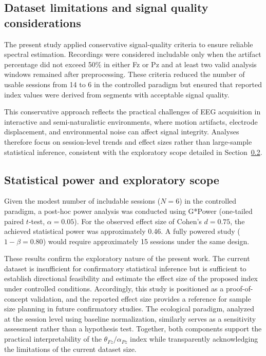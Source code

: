 \documentclass[10pt]{iopart}
\begin{document}
\subsection{Dataset limitations and signal quality considerations}

The present study applied conservative signal-quality criteria
to ensure reliable spectral estimation. Recordings were considered
includable only when the artifact percentage did not exceed 50\%
in either Fz or Pz and at least two valid analysis windows
remained after preprocessing. These criteria reduced the number
of usable sessions from 14 to 6 in the controlled paradigm but
ensured that reported index values were derived from segments
with acceptable signal quality.

This conservative approach reflects the practical challenges of
EEG acquisition in interactive and semi-naturalistic environments,
where motion artifacts, electrode displacement, and environmental
noise can affect signal integrity. Analyses therefore focus on
session-level trends and effect sizes rather than large-sample
statistical inference, consistent with the exploratory scope
detailed in Section~\ref{sec:power}.

\subsection{Statistical power and exploratory scope}
\label{sec:power}

Given the modest number of includable sessions ($N = 6$) in the
controlled paradigm, a post-hoc power analysis was conducted using
G*Power (one-tailed paired $t$-test, $\alpha = 0.05$). For the
observed effect size of Cohen's $d = 0.75$, the achieved statistical
power was approximately 0.46. A fully powered study ($1-\beta = 0.80$)
would require approximately 15 sessions under the same design.

These results confirm the exploratory nature of the present work.
The current dataset is insufficient for confirmatory statistical
inference but is sufficient to establish directional feasibility
and estimate the effect size of the proposed index under controlled
conditions. Accordingly, this study is positioned as a
proof-of-concept validation, and the reported effect size provides
a reference for sample size planning in future confirmatory studies.
The ecological paradigm, analyzed at the session level using
baseline normalization, similarly serves as a sensitivity assessment
rather than a hypothesis test. Together, both components support
the practical interpretability of the $\theta_{Fz}/\alpha_{Pz}$
index while transparently acknowledging the limitations of the
current dataset size.
\end{document}
